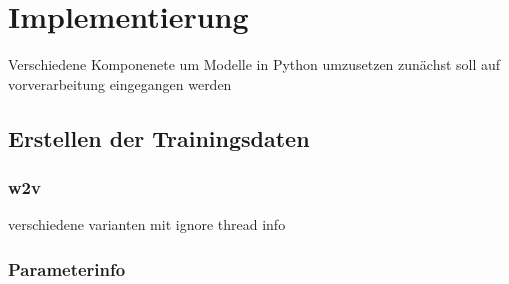 \chapter{Implementierung}\label{ch:implementierung}
Verschiedene Komponenete um Modelle in Python umzusetzen 
zunächst soll auf vorverarbeitung eingegangen werden

\section{Erstellen der Trainingsdaten}
\subsection{w2v}
verschiedene varianten mit ignore thread info
\subsection{Parameterinfo}

